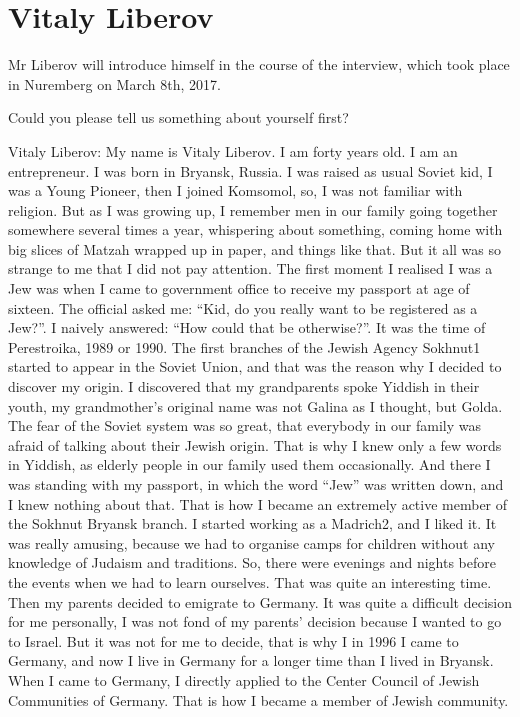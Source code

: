 \section{Vitaly Liberov}

Mr Liberov will introduce himself in the course of the interview, which took place in Nuremberg on March 8th, 2017. 

Could you please tell us something about yourself first? 

Vitaly Liberov: My name is Vitaly Liberov. I am forty years old. I am an entrepreneur. I was born in Bryansk, Russia. I was raised as usual Soviet kid, I was a Young Pioneer, then I joined Komsomol, so, I was not familiar with religion. But as I was growing up, I remember men in our family going together somewhere several times a year, whispering about something, coming home with big slices of Matzah wrapped up in paper, and things like that. But it all was so strange to me that I did not pay attention. The first moment I realised I was a Jew was when I came to government office to receive my passport at age of sixteen. The official asked me: “Kid, do you really want to be registered as a Jew?”. I naively answered: “How could that be otherwise?”. It was the time of Perestroika, 1989 or 1990. The first branches of the Jewish Agency Sokhnut1 started to appear in the Soviet Union, and that was the reason why I decided to discover my origin. I discovered that my grandparents spoke Yiddish in their youth, my grandmother’s original name was not Galina as I thought, but Golda. The fear of the Soviet system was so great, that everybody in our family was afraid of talking about their Jewish origin. That is why I knew only a few words in Yiddish, as elderly people in our family used them occasionally. And there I was standing with my passport, in which the word “Jew” was written down, and I knew nothing about that. That is how I became an extremely active member of the Sokhnut Bryansk branch. I started working as a Madrich2, and I liked it.  It was really amusing, because we had to organise camps for children without any knowledge of Judaism and traditions. So, there were evenings and nights before the events when we had to learn ourselves. That was quite an interesting time. Then my parents decided to emigrate to Germany. It was quite a difficult decision for me personally, I was not fond of my parents’ decision because I wanted to go to Israel. But it was not for me to decide, that is why I in 1996 I came to Germany, and now I live in Germany for a longer time than I lived in Bryansk. When I came to Germany, I directly applied to the Center Council of Jewish Communities of Germany. That is how I became a member of Jewish community.  

